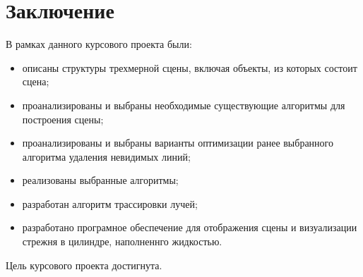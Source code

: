 \chapter*{Заключение}

В рамках данного курсового проекта были:

\begin{itemize}
	\item описаны структуры трехмерной сцены, включая объекты, из которых состоит сцена;
	\item проанализированы и выбраны необходимые существующие алгоритмы для построения сцены;
	\item проанализированы и выбраны варианты оптимизации ранее выбранного алгоритма удаления невидимых линий;
	\item реализованы выбранные алгоритмы;
	\item разработан алгоритм трассировки лучей;
	\item разработано програмное обеспечение для отображения сцены и визуализации стрежня в цилиндре, наполненнго жидкостью.
\end{itemize}

Цель курсового проекта достигнута.